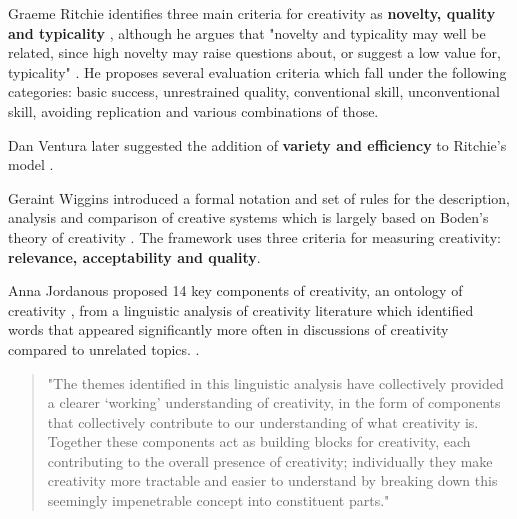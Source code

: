 Graeme Ritchie identifies three main criteria for creativity as \textbf{novelty, quality and typicality} \citep[p.72-73]{Ritchie2007}, although he argues that "novelty and typicality may well be related, since high novelty may raise questions about, or suggest a low value for, typicality" \citep[p.73]{Ritchie2007} \citep[see also]{Ritchie2001}. He proposes several evaluation criteria which fall under the following categories: \citep[p.91-92]{Ritchie2007} basic success, unrestrained quality, conventional skill, unconventional skill, avoiding replication and various combinations of those.

Dan Ventura later suggested the addition of \textbf{variety and efficiency} to Ritchie’s model \citep[p.7]{Ventura2008}.

Geraint Wiggins introduced a formal notation and set of rules for the description, analysis and comparison of creative systems \citep{Wiggins2006} which is largely  based on Boden’s theory of creativity \citep{Boden2003}. The framework uses three criteria for measuring creativity: \textbf{relevance, acceptability and quality}.

Anna Jordanous proposed 14 key components of creativity, an ontology of creativity \citep[p.104-120]{Jordanous2012}, from a linguistic analysis of creativity literature which identified words that appeared significantly more often in discussions of creativity compared to unrelated topics. \citep[p.120]{Jordanous2012}.

\begin{quote}
  "The themes identified in this linguistic analysis have collectively provided a clearer ‘working’ understanding of creativity, in the form of components that collectively contribute to our understanding of what creativity is. Together these components act as building blocks for creativity, each contributing to the overall presence of creativity; individually they make creativity more tractable and easier to understand by breaking down this seemingly impenetrable concept into constituent parts."  \citep[p.120]{Jordanous2012}
\end{quote}

